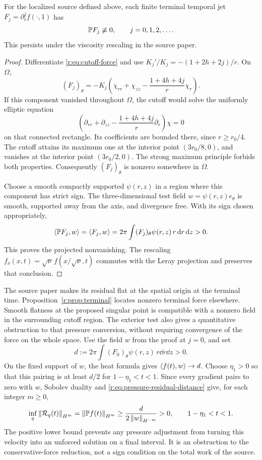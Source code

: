 \begin{proposition}\label{r:prop:terminal}
For the localized source defined above, each finite terminal temporal jet
\(F_j=\partial_t^jf(\cdot,1)\) has
\[
 \mathbb P F_j\not\equiv0,\qquad j=0,1,2,\ldots.
\]
This persists under the viscosity rescaling in the source paper.
\end{proposition}
\begin{proof}
Differentiate \eqref{r:eq:cutoff-force} and use
\(K_j'/K_j=-(1+2h+2j)/r\). On \(\Omega\),
\begin{equation}
 (F_j)_\theta=-K_j
 \left(\chi_{rr}+\chi_{zz}
             -\frac{1+4h+4j}{r}\chi_r\right).
 \label{r:eq:terminal-residual}
\end{equation}
If this component vanished throughout \(\Omega\), the cutoff would
solve the uniformly elliptic equation
\[
 \left(\partial_{rr}+\partial_{zz}
             -\frac{1+4h+4j}{r}\partial_r\right)\chi=0
\]
on that connected rectangle. Its coefficients are bounded there,
since \(r\ge r_0/4\). The cutoff attains its maximum one at the
interior point \((3r_0/8,0)\), and vanishes at the interior point
\((3r_0/2,0)\). The strong maximum principle forbids both properties.
Consequently \((F_j)_\theta\) is nonzero somewhere in \(\Omega\).

Choose a smooth compactly supported \(\psi(r,z)\) in a region where
this component has strict sign. The three-dimensional test field
\(w=\psi(r,z)e_\theta\) is smooth, supported away from the axis, and
divergence free. With its sign chosen appropriately,
\[
 \left\langle \mathbb P F_j,w\right\rangle=\left\langle F_j,w\right\rangle
 =2\pi\int (F_j)_\theta\psi(r,z)\,r\,\mathrm d r\,\mathrm d z>0.
\]
This proves the projected nonvanishing. The rescaling
\(f_\nu(x,t)=\sqrt\nu\,f(x/\sqrt\nu,t)\)
\cite[Section~10, (10.22)]{openai-paper}
commutes with the Leray projection and preserves that conclusion.
\end{proof}

The source paper makes its residual flat at the spatial origin at the
terminal time. Proposition~\ref{r:prop:terminal} locates nonzero terminal
force elsewhere. Smooth flatness at the proposed singular point is
compatible with a nonzero field in the surrounding cutoff region.
The exterior test also gives a quantitative obstruction to that pressure
conversion, without requiring convergence of the force on the whole space.
Use the field \(w\) from the proof at \(j=0\), and set
\[
 d:=2\pi\int (F_0)_\theta\psi(r,z)\,r\dd r\dd z>0.
\]
On the fixed support of \(w\), the heat formula gives
\(\left\langle f(t),w\right\rangle\to d\). Choose \(\eta_1>0\) so that this pairing is
at least \(d/2\) for \(1-\eta_1<t<1\). Since every gradient pairs to
zero with \(w\), Sobolev duality and
\eqref{r:eq:pressure-residual-distance} give, for each integer \(m\ge0\),
\begin{equation}
 \inf_q\left\lVert \mathcal R_q(t)\right\rVert_{H^m}
 =\left\lVert \mathbb P f(t)\right\rVert_{H^m}
 \ge\frac{d}{2\left\lVert w\right\rVert_{H^{-m}}}>0,
 \qquad 1-\eta_1<t<1.
 \label{r:eq:actual-pressure-obstruction}
\end{equation}
The positive lower bound prevents any pressure adjustment from
turning this velocity into an unforced solution on a final interval.
It is an obstruction to the conservative-force reduction, not a sign
condition on the total work of the source.


